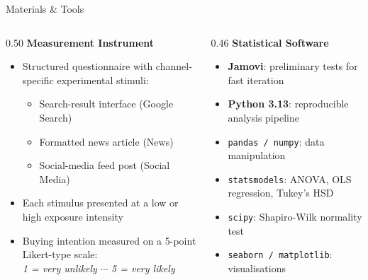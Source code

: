 \documentclass[aspectratio=169, 10pt]{beamer}
\begin{document}
\begin{frame}{Materials \& Tools}
  \begin{columns}[T]
    \begin{column}{0.50\textwidth}
      \textbf{Measurement Instrument}
      \vspace{0.4em}
      \begin{itemize}
        \setlength\itemsep{0.45em}
        \item Structured questionnaire with channel-specific experimental stimuli:
          \begin{itemize}
            \setlength\itemsep{0.2em}
            \item Search-result interface (Google Search)
            \item Formatted news article (News)
            \item Social-media feed post (Social Media)
          \end{itemize}
        \item Each stimulus presented at a low or high exposure intensity
        \item Buying intention measured on a 5-point Likert-type scale:\\[0.2em]
          {\scriptsize\textit{1 = very unlikely} \quad $\cdots$ \quad \textit{5 = very likely}}
      \end{itemize}
    \end{column}
    \begin{column}{0.46\textwidth}
      \textbf{Statistical Software}
      \vspace{0.4em}
      \begin{itemize}
        \setlength\itemsep{0.45em}
        \item \textbf{Jamovi}: preliminary tests for fast iteration
        \item \textbf{Python 3.13}: reproducible analysis pipeline
        \item \texttt{pandas / numpy}: data manipulation
        \item \texttt{statsmodels}: ANOVA, OLS regression, Tukey's HSD
        \item \texttt{scipy}: Shapiro-Wilk normality test
        \item \texttt{seaborn / matplotlib}: visualisations
      \end{itemize}
    \end{column}
  \end{columns}
\end{frame}
\end{document}
